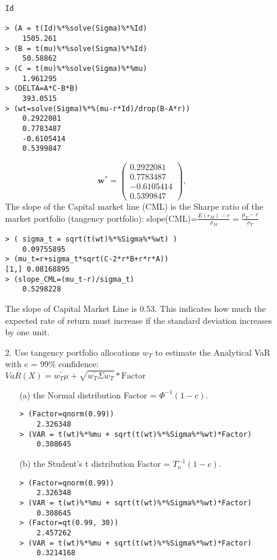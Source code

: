 \documentclass[11pt,oneside,a4paper, titlepage]{article}
\begin{document}
\begin{enumerate}
\begin{enumerate}
\begin{verbatim}
Id

> (A = t(Id)%*%solve(Sigma)%*%Id)
	1505.261
> (B = t(mu)%*%solve(Sigma)%*%Id)
	50.58862
> (C = t(mu)%*%solve(Sigma)%*%mu)
	1.961295
> (DELTA=A*C-B*B)
	393.0515
> (wt=solve(Sigma)%*%(mu-r*Id)/drop(B-A*r))
	0.2922081
	0.7783487
	-0.6105414
	0.5399847
\end{verbatim}
\begin{displaymath}
\mathbf{w^*} =
\left( \begin{array}{c}
0.2922081\\
0.7783487\\
-0.6105414\\
0.5399847
\end{array} \right),
\end{displaymath}
The slope of the Capital market line (CML) is the Sharpe ratio of the market portfolio (tangency portfolio):
slope(CML)=\(\frac{E(r_M)-r}{\sigma_M}=\frac{\mu_T-r}{\sigma_T}\)
\begin{verbatim}
> ( sigma_t = sqrt(t(wt)%*%Sigma%*%wt) )
	0.09755895
> (mu_t=r+sigma_t*sqrt(C-2*r*B+r*r*A))
[1,] 0.08168895
> (slope_CML=(mu_t-r)/sigma_t)
	0.5298228
\end{verbatim}
The slope of Capital Market Line is \(0.53\). This indicates how much the expected rate of return must increase if the standard deviation increases by one unit.
\item [2.]
Use tangency portfolio allocations \(w_T\) to estimate the Analytical VaR with c = 99\% confidence:\\
\(VaR(X)=w_{T}^{'}\mu+\sqrt{w_{T}^{'}\Sigma w_{T}}*\text{Factor}\)
\begin{enumerate}
\item [(a)] the Normal distribution Factor = \(\Phi^{-1}(1-c)\).
\begin{verbatim}
> (Factor=qnorm(0.99))
	2.326348
> (VAR = t(wt)%*%mu + sqrt(t(wt)%*%Sigma%*%wt)*Factor)
	0.308645
\end{verbatim}

\item [(b)] the Student's t distribution Factor = \(T_{\nu}^{-1}(1-c)\).
\begin{verbatim}
> (Factor=qnorm(0.99))
	2.326348
> (VAR = t(wt)%*%mu + sqrt(t(wt)%*%Sigma%*%wt)*Factor)
	0.308645
> (Factor=qt(0.99, 30))
	2.457262
> (VAR = t(wt)%*%mu + sqrt(t(wt)%*%Sigma%*%wt)*Factor)
	0.3214168
\end{verbatim}
\end{enumerate}
\end{enumerate}
\end{enumerate}
\end{document}
